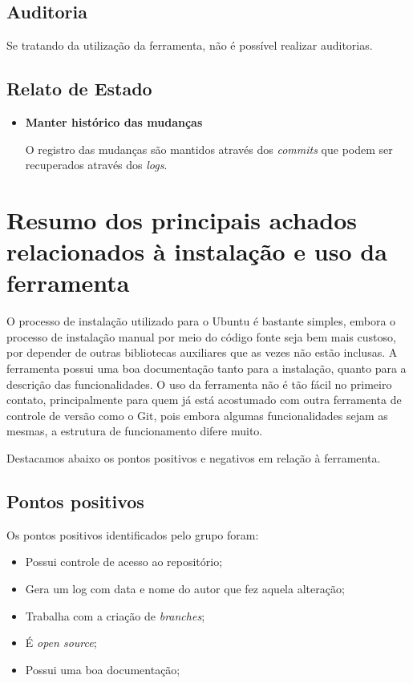  \subsection{Auditoria}

  Se tratando da utilização da ferramenta, não é possível realizar auditorias.

 \subsection{Relato de Estado}
 \begin{itemize}
  \item \textbf{Manter histórico das mudanças}

  O registro das mudanças são mantidos através dos \textit{commits} que podem ser recuperados através dos \textit{logs}.

 \end{itemize}
\section{Resumo dos principais achados relacionados à instalação e uso da ferramenta}

	O processo de instalação utilizado para o Ubuntu é bastante simples, embora o processo de instalação manual por meio do
	código fonte seja bem mais custoso, por depender de outras bibliotecas auxiliares que as vezes não estão inclusas.
	A ferramenta possui uma boa documentação tanto para a instalação, quanto para a descrição das funcionalidades.
	O uso da ferramenta não é tão fácil no primeiro contato, principalmente para quem já está acostumado com outra ferramenta
	de controle de versão como o Git, pois embora algumas funcionalidades sejam as mesmas, a estrutura de funcionamento difere muito.

	Destacamos abaixo os pontos positivos e negativos em relação à ferramenta.

	\subsection{Pontos positivos}

			Os pontos positivos identificados pelo grupo foram:

			\begin{itemize}
				\item Possui controle de acesso ao repositório;
				\item Gera um log com data e nome do autor que fez aquela alteração;
				\item Trabalha com a criação de \textit{branches};
				\item É \textit{open source};
				\item Possui uma boa documentação;
			\end{itemize}


